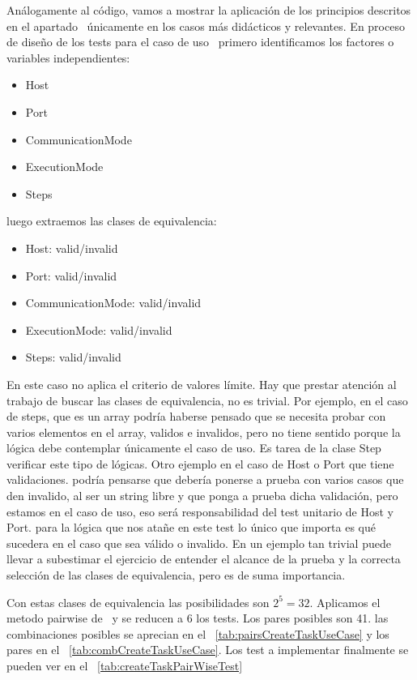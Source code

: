 
Análogamente al código, vamos a mostrar la aplicación de los principios descritos en el apartado~ únicamente en los casos más didácticos y relevantes. En proceso de diseño de los tests para el caso de uso~ primero identificamos los factores o variables independientes:

\begin{itemize}
    \item Host
    \item Port
    \item CommunicationMode
    \item ExecutionMode
    \item Steps
\end{itemize}

luego extraemos las clases de equivalencia:

\begin{itemize}
    \item Host: valid/invalid
    \item Port: valid/invalid
    \item CommunicationMode: valid/invalid
    \item ExecutionMode: valid/invalid
    \item Steps: valid/invalid
\end{itemize}

En este caso no aplica el criterio de valores límite. Hay que prestar atención al trabajo de buscar las clases de equivalencia, no es trivial. Por ejemplo, en el caso de steps, que es un array podría haberse pensado que se necesita probar con varios elementos en el array, validos e invalidos, pero no tiene sentido porque la lógica debe contemplar únicamente el caso de uso. Es tarea de la clase Step verificar este tipo de lógicas. Otro ejemplo en el caso de Host o Port que tiene validaciones. podría pensarse que debería ponerse a prueba con varios casos que den invalido, al ser un string libre y que ponga a prueba dicha validación, pero estamos en el caso de uso, eso será responsabilidad del test unitario de Host y Port. para la lógica que nos atañe en este test lo único que importa es qué sucedera en el caso que sea válido o invalido. En un ejemplo tan trivial puede llevar a subestimar el ejercicio de entender el alcance de la prueba y la correcta selección de las clases de equivalencia, pero es de suma importancia.

Con estas clases de equivalencia las posibilidades son $2^5 = 32$. Aplicamos el metodo pairwise de~ y se reducen a 6 los tests. Los pares posibles son 41. las combinaciones posibles se aprecian en el ~\cref{tab:pairsCreateTaskUseCase} y los pares en el ~\cref{tab:combCreateTaskUseCase}. Los test a implementar finalmente se pueden ver en el ~\cref{tab:createTaskPairWiseTest}

